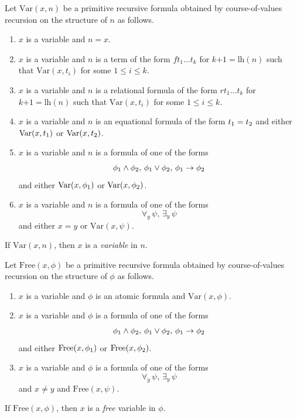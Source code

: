 \documentclass[10pt]{amsart}
\newcommand{\mleq}{\boldsymbol{\leq}}
\newcommand{\meq}{\boldsymbol{=}}
\newcommand{\mplus}{\boldsymbol{+}}
\begin{document}
\begin{definition}
	Let $\mathrm{Var}(x,n)$ be a primitive recursive formula obtained by course-of-values recursion on the structure of $n$ as follows.
  \begin{enumerate}[label=\textbf{(\arabic*)}, leftmargin=3.0em]
    \item $x$ is a variable and $n \meq x$.
    \item $x$ is a variable and $n$ is a term of the form $ft_1...t_k$ for $k \mplus 1 = \mathrm{lh}(n)$ such that $\mathrm{Var}(x,t_i)$ for some $1 \mleq i \mleq k$.
    \item $x$ is a variable and $n$ is a relational formula of the form $rt_1...t_k$ for $k \mplus 1 = \mathrm{lh}(n)$ such that $\mathrm{Var}(x,t_i)$ for some $1 \mleq i \mleq k$.
    \item $x$ is a variable and $n$ is an equational formula of the form $t_{\rm{1}} = t_{\rm{2}}$ and either $\mathrm{Var}(x,t_{\rm{1}})$ or $\mathrm{Var}(x,t_{\rm{2}})$.
    \item $x$ is a variable and $n$ is a formula of one of the forms
      $$\phi_{\rm{1}}\wedge \phi_{\rm{2}},\,\phi_{\rm{1}} \vee \phi_{\rm{2}},\,\phi_{\rm{1}}\rightarrow \phi_{\rm{2}}$$
      and either $\mathrm{Var}(x,\phi_{\rm{1}})$ or $\mathrm{Var}(x,\phi_{\rm{2}})$.
    \item $x$ is a variable and $n$ is a formula of one of the forms
      $$\forall_y\,\psi,\,\exists_y\,\psi$$
      and either $x = y$ or $\mathrm{Var}(x,\psi)$.
  \end{enumerate}
  If $\mathrm{Var}(x,n)$, then $x$ is a \textit{variable} in $n$.
 \end{definition}

\begin{definition}
	Let $\mathrm{Free}(x,\phi)$ be a primitive recursive formula obtained by course-of-values recursion on the structure of $\phi$ as follows.
  \begin{enumerate}[label=\textbf{(\arabic*)}, leftmargin=3.0em]
    \item $x$ is a variable and $\phi$ is an atomic formula and $\mathrm{Var}(x,\phi)$.
    \item $x$ is a variable and $\phi$ is a formula of one of the forms
      $$\phi_{\rm{1}}\wedge \phi_{\rm{2}},\,\phi_{\rm{1}} \vee \phi_{\rm{2}},\,\phi_{\rm{1}}\rightarrow \phi_{\rm{2}}$$
      and either $\mathrm{Free}(x,\phi_{\rm{1}})$ or $\mathrm{Free}(x,\phi_{\rm{2}})$.
    \item $x$ is a variable and $\phi$ is a formula of one of the forms
      $$\forall_y\,\psi,\,\exists_y\,\psi$$
      and $x \neq y$ and $\mathrm{Free}(x,\psi)$.
  \end{enumerate}
  If $\mathrm{Free}(x,\phi)$, then $x$ is a \textit{free} variable in $\phi$. 
\end{definition}
\end{document}
